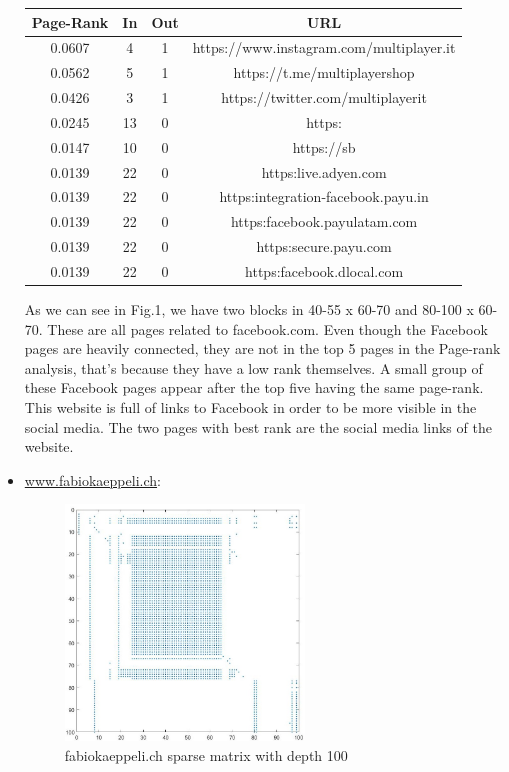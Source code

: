 \documentclass[unicode,11pt,a4paper,oneside,numbers=endperiod,openany]{scrartcl}
\begin{document}
\begin{itemize}
\begin{center}
 \begin{tabular}{||c | c | c | c||} 
 \hline
 Page-Rank & In & Out & URL \\ [0.5ex] 
 \hline\hline
 0.0607 & 4 & 1 & https://www.instagram.com/multiplayer.it \\ 
 \hline
 0.0562 & 5 & 1 & https://t.me/multiplayershop \\
 \hline
 0.0426 & 3 & 1 & https://twitter.com/multiplayerit \\
 \hline
 0.0245 & 13 & 0 & https: \\
 \hline
 0.0147 & 10 & 0 & https://sb \\
 \hline
 0.0139 & 22 & 0 & https:\/\/live.adyen.com \\
 \hline
 0.0139 & 22 & 0 & https:\/\/integration-facebook.payu.in\\
 \hline
 0.0139 & 22 & 0 & https:\/\/facebook.payulatam.com \\
 \hline
 0.0139 & 22 & 0 & https:\/\/secure.payu.com \\
 \hline
 0.0139 & 22 & 0 & https:\/\/facebook.dlocal.com \\
 \hline
\end{tabular}
\end{center}

As we can see in Fig.1, we have two blocks in 40-55 x 60-70 and 80-100 x 60-70. These are all pages related to facebook.com. Even though the Facebook pages are heavily connected, they are not in the top 5 pages in the Page-rank analysis, that's because they have a low rank themselves. A small group of these Facebook pages appear after the top five having the same page-rank. This website is full of links to Facebook in order to be more visible in the social media. The two pages with best rank are the social media links of the website.

\newpage

    \item \href{http://www.fabiokaeppeli.ch/}{www.fabiokaeppeli.ch}:
    \begin{figure}[H]
    \centering
    
    \includegraphics[width=0.6\textwidth]{fk100.jpg}
    \caption{fabiokaeppeli.ch sparse matrix with depth 100}
    

\end{figure}
\end{itemize}
\end{document}
